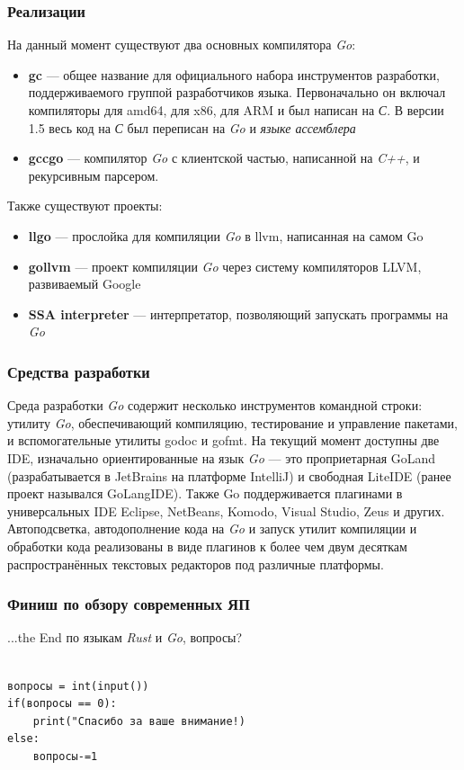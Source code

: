 \documentclass[11pt]{beamer}
\begin{document}
\begin{frame}
\frametitle{Реализации}
На данный момент существуют два основных компилятора \textit{Go}:
\begin{itemize}
    \item \textbf{gc} — общее название для официального набора инструментов разработки, поддерживаемого группой разработчиков языка. Первоначально он включал компиляторы для {\color{brown}amd64}, для {\color{brown}x86}, для {\color{brown}ARM} и был написан на \textit{С}. В версии 1.5 весь код на \textit{С} был переписан на \textit{Go} и \textit{языке ассемблера}
    \item \textbf{gccgo} — компилятор \textit{Go} с клиентской частью, написанной на \textit{C++}, и рекурсивным парсером.
\end{itemize}
Также существуют проекты:
\begin{itemize}
    \item \textbf{llgo} — прослойка для компиляции \textit{Go} в llvm, написанная на самом Go 
    \item \textbf{gollvm} — проект компиляции \textit{Go} через систему компиляторов LLVM, развиваемый Google
    \item \textbf{SSA interpreter} — интерпретатор, позволяющий запускать программы на \textit{Go}
\end{itemize}
\end{frame}
\begin{frame}
\frametitle{Средства разработки}
Среда разработки \textit{Go} содержит несколько инструментов командной строки: утилиту \textit{Go}, обеспечивающий компиляцию, тестирование и управление пакетами, и вспомогательные утилиты {\color{blue}godoc} и {\color{blue}gofmt}. На текущий момент доступны две {\color{blue}IDE}, изначально ориентированные на язык \textit{Go} — это проприетарная {\color{blue}GoLand} (разрабатывается в JetBrains на платформе {\color{blue}IntelliJ}) и свободная {\color{blue}LiteIDE} (ранее проект назывался {\color{blue}GoLangIDE}).
Также Go поддерживается плагинами в универсальных IDE {\color{blue}Eclipse}, {\color{blue}NetBeans}, {\color{blue}Komodo}, {\color{blue}Visual Studio}, {\color{blue}Zeus} и других. Автоподсветка, автодополнение кода на \textit{Go} и запуск утилит компиляции и обработки кода реализованы в виде плагинов к более чем двум десяткам распространённых текстовых редакторов под различные платформы.
\end{frame}
\begin{frame}[fragile]
\frametitle{Финиш по обзору современных ЯП}
...the End по языкам \textit{Rust} и \textit{Go}, вопросы? 
\begin{verbatim}

вопросы = int(input())
if(вопросы == 0):
    print("Спасибо за ваше внимание!)
else:
    вопросы-=1
\end{verbatim}
\centering
\end{frame}
\end{document}
